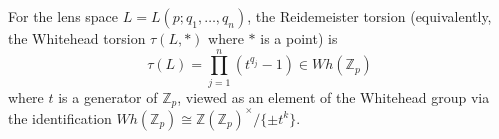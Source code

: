 For the lens space $L = L(p; q_1, \ldots, q_n)$, the Reidemeister torsion (equivalently, the Whitehead torsion $\tau(L, *)$ where $*$ is a point) is
$$\tau(L) = \prod_{j=1}^n (t^{q_j} - 1) \in Wh(\mathbb{Z}_p)$$
where $t$ is a generator of $\mathbb{Z}_p$, viewed as an element of the Whitehead group via the identification $Wh(\mathbb{Z}_p) \cong \mathbb{Z}(\mathbb{Z}_p)^\times / \{\pm t^k\}$.
